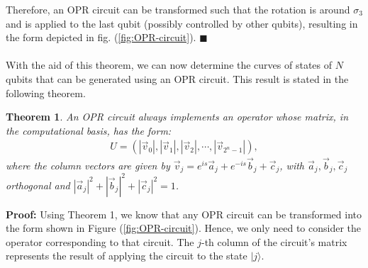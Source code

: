 \documentclass[10pt,letterpaper]{article} %
\newtheorem{theorem}{Theorem}
\begin{document}
Therefore, an OPR circuit can be transformed such
that the rotation is around $\sigma_3$ and is applied to the last qubit 
(possibly controlled by other qubits), 
resulting in the form depicted in fig. (\ref{fig:OPR-circuit}). 
$\blacksquare$ \\
$\;$\\

With the aid of this theorem, we can now determine the curves
of states of $N$ qubits that can be generated using an OPR circuit. 
This result is stated in the following theorem.

\begin{theorem}
An OPR circuit always implements an operator whose matrix,
in the computational basis, has the form:
\begin{eqnarray}
U = (|\vec{v}_0|, |\vec{v}_1|, |\vec{v}_2|, \cdots, |\vec{v}_{2^n-1}|),
\end{eqnarray}
where the column vectors are given by $\vec{v}_j = e^{is} \vec{a}_j + e^{-is} \vec{b}_j + \vec{c}_j$,
with $\vec{a}_j ,\vec{b}_j, \vec{c}_j$ orthogonal and $|\vec{a}_j|^2 + |\vec{b}_j|^2 + |\vec{c}_j|^2 = 1$.
\end{theorem}
\textbf{Proof:} 
Using Theorem 1, we know that any OPR circuit can be transformed into the 
form shown in Figure (\ref{fig:OPR-circuit}).
Hence, we only need to consider the operator corresponding to that circuit. 
The $j$-th column of the circuit's matrix represents the result of applying the circuit to the state $|j\rangle$.
\end{document}
